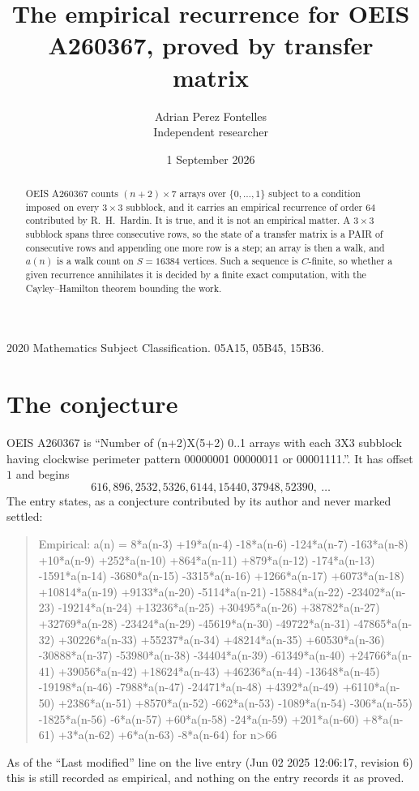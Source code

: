\documentclass[11pt,a4paper]{article}
\title{The empirical recurrence for OEIS A260367, proved by transfer matrix}
\author{Adrian Perez Fontelles\\ \small Independent researcher}
\date{1 September 2026}
\theoremstyle{plain}
\theoremstyle{definition}
\begin{document}
\maketitle

\begin{abstract}
OEIS A260367 counts $(n+2)\times7$ arrays over $\{0,\dots,1\}$ subject to a condition imposed on
every $3\times3$ subblock, and it carries an empirical recurrence of order $64$
contributed by R.~H.~Hardin. It is true, and it is not an empirical matter. A $3\times3$
subblock spans three consecutive rows, so the state of a transfer matrix is a PAIR of
consecutive rows and appending one more row is a step; an array is then a walk, and
$a(n)$ is a walk count on $S=16384$ vertices. Such a sequence is $C$-finite, so whether a given
recurrence annihilates it is decided by a finite exact computation, with the Cayley--Hamilton
theorem bounding the work.
\end{abstract}

\noindent\small 2020 Mathematics Subject Classification. 05A15, 05B45, 15B36.\normalsize

\section{The conjecture}

OEIS A260367 is ``Number of (n+2)X(5+2) 0..1 arrays with each 3X3 subblock having clockwise perimeter pattern 00000001 00000011 or 00001111.''. It has offset $1$ and begins
\[
616, 896, 2532, 5326, 6144, 15440, 37948, 52390,\ \dots
\]
The entry states, as a conjecture contributed by its author and never marked settled:
\begin{quote}
Empirical: a(n) = 8*a(n-3) +19*a(n-4) -18*a(n-6) -124*a(n-7) -163*a(n-8) +10*a(n-9) +252*a(n-10) +864*a(n-11) +879*a(n-12) -174*a(n-13) -1591*a(n-14) -3680*a(n-15) -3315*a(n-16) +1266*a(n-17) +6073*a(n-18) +10814*a(n-19) +9133*a(n-20) -5114*a(n-21) -15884*a(n-22) -23402*a(n-23) -19214*a(n-24) +13236*a(n-25) +30495*a(n-26) +38782*a(n-27) +32769*a(n-28) -23424*a(n-29) -45619*a(n-30) -49722*a(n-31) -47865*a(n-32) +30226*a(n-33) +55237*a(n-34) +48214*a(n-35) +60530*a(n-36) -30888*a(n-37) -53980*a(n-38) -34404*a(n-39) -61349*a(n-40) +24766*a(n-41) +39056*a(n-42) +18624*a(n-43) +46236*a(n-44) -13648*a(n-45) -19198*a(n-46) -7988*a(n-47) -24471*a(n-48) +4392*a(n-49) +6110*a(n-50) +2386*a(n-51) +8570*a(n-52) -662*a(n-53) -1089*a(n-54) -306*a(n-55) -1825*a(n-56) -6*a(n-57) +60*a(n-58) -24*a(n-59) +201*a(n-60) +8*a(n-61) +3*a(n-62) +6*a(n-63) -8*a(n-64) for n>66
\end{quote}
As of the ``Last modified'' line on the live entry (Jun 02 2025 12:06:17, revision 6) this is still
recorded as empirical, and nothing on the entry records it as proved.
\end{document}
